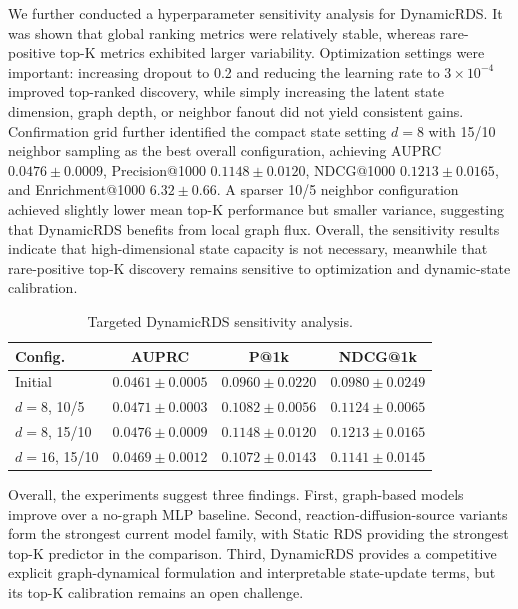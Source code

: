 \documentclass[conference]{IEEEtran}
\begin{document}
We further conducted a hyperparameter sensitivity analysis for DynamicRDS. It was shown that global ranking metrics were relatively stable, whereas rare-positive top-K metrics exhibited larger variability. Optimization settings were important: increasing dropout to 0.2 and reducing the learning rate to $3\times10^{-4}$ improved top-ranked discovery, while simply increasing the latent state dimension, graph depth, or neighbor fanout did not yield consistent gains. Confirmation grid further identified the compact state setting $d=8$ with 15/10 neighbor sampling as the best overall configuration, achieving AUPRC $0.0476 \pm 0.0009$, Precision@1000 $0.1148 \pm 0.0120$, NDCG@1000 $0.1213 \pm 0.0165$, and Enrichment@1000 $6.32 \pm 0.66$. A sparser 10/5 neighbor configuration achieved slightly lower mean top-K performance but smaller variance, suggesting that DynamicRDS benefits from local graph flux. Overall, the sensitivity results indicate that high-dimensional state capacity is not necessary, meanwhile that rare-positive top-K discovery remains sensitive to optimization and dynamic-state calibration.

\begin{table}[t]
\caption{Targeted DynamicRDS sensitivity analysis.}
\label{tab:sensitivity}
\centering
\scriptsize
\setlength{\tabcolsep}{3pt}
\begin{tabular}{@{}lccc@{}}
\hline
Config. & AUPRC & P@1k & NDCG@1k \\
\hline
Initial
& $0.0461{\pm}0.0005$
& $0.0960{\pm}0.0220$
& $0.0980{\pm}0.0249$ \\
$d{=}8$, 10/5
& $0.0471{\pm}0.0003$
& $0.1082{\pm}0.0056$
& $0.1124{\pm}0.0065$ \\
$d{=}8$, 15/10
& $\mathbf{0.0476{\pm}0.0009}$
& $\mathbf{0.1148{\pm}0.0120}$
& $\mathbf{0.1213{\pm}0.0165}$ \\
$d{=}16$, 15/10
& $0.0469{\pm}0.0012$
& $0.1072{\pm}0.0143$
& $0.1141{\pm}0.0145$ \\
\hline
\end{tabular}
\end{table}

Overall, the experiments suggest three findings. First, graph-based models improve over a no-graph MLP baseline. Second, reaction-diffusion-source variants form the strongest current model family, with Static RDS providing the strongest top-K predictor in the comparison. Third, DynamicRDS provides a competitive explicit graph-dynamical formulation and interpretable state-update terms, but its top-K calibration remains an open challenge.
\end{document}
